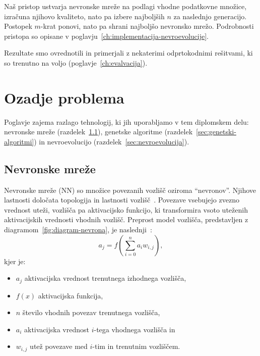 \documentclass[a4paper,12pt,openright]{book}
\begin{document}
    Naš pristop ustvarja nevronske mreže na podlagi vhodne
    podatkovne množice, izračuna njihovo kvaliteto, nato pa izbere najboljših $n$ za naslednjo generacijo.
    Postopek $m$-krat ponovi, nato pa shrani najboljšo nevronsko mrežo.
    Podrobnosti pristopa so opisane v poglavju~\ref{ch:implementacija-nevroevolucije}.

    Rezultate smo ovrednotili in primerjali z nekaterimi odprtokodnimi rešitvami, ki so trenutno na voljo (poglavje~\ref{ch:evalvacija}).


    \chapter{Ozadje problema}\label{ch:ozadje-problema}
    Poglavje zajema razlago tehnologij, ki jih uporabljamo v tem diplomskem delu: nevronske mreže (razdelek~\ref{sec:nevronske-mreze}),
    genetske algoritme (razdelek~\ref{sec:genetski-algoritmi}) in nevroevolucijo (razdelek~\ref{sec:nevroevolucija}).

    \section{Nevronske mreže}\label{sec:nevronske-mreze}
    Nevronske mreže (NN) so množice povezanih vozlišč oziroma \enquote{nevronov}.
    Njihove lastnosti določata topologija in lastnosti vozlišč~\cite{russell_norvig_2016}.
    Povezave vsebujejo zvezno vrednost uteži, vozlišča pa aktivacijsko funkcijo, ki transformira vsoto uteženih
    aktivacijskih vrednosti vhodnih vozlišč.
    Preprost model vozlišča, predstavljen z diagramom~\ref{fig:diagram-nevrona}, je naslednji~\cite{russell_norvig_2016}:
    \begin{equation}
        a_j=f(\sum_{i=0}^{n} a_i w_{i,j}),
        \label{eq:neuron_model_splosno}
    \end{equation}
    kjer je:
    \begin{itemize}
        \item $a_j$ aktivacijska vrednost trenutnega izhodnega vozlišča,
        \item $f(x)$ aktivacijska funkcija,
        \item $n$ število vhodnih povezav trenutnega vozlišča,
        \item $a_i$ aktivacijska vrednost $i$-tega vhodnega vozlišča in
        \item $w_{i,j}$ utež povezave med $i$-tim in trenutnim vozliščem.
    \end{itemize}
\end{document}
